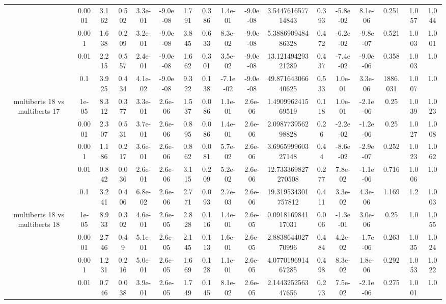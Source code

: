 \begin{tabular}{|c|c|c|c|c|c|c|c|c|c|c|c|c|c|c|c|c|}
 & 0.0001 & 3.162 & 0.502 & 3.3e-01 & -9.0e-08 & 1.791 & 0.386 & 1.4e-01 & -9.0e-08 & 3.544761657714843 & 0.393 & -5.8e-02 & 8.1e-06 & 0.251 & 1.057 & 1.044 \\
 & 0.001 & 1.638 & 0.209 & 3.2e-01 & -9.0e-08 & 3.845 & 0.633 & 8.3e-02 & -9.0e-08 & 5.388690948486328 & 0.472 & -6.2e-02 & -9.8e-07 & 0.521 & 1.003 & 1.001 \\
 & 0.01 & 2.215 & 0.557 & 2.4e-01 & -9.0e-08 & 1.662 & 0.301 & 3.5e-02 & -9.0e-08 & 13.12149429321289 & 0.437 & -7.4e-02 & -9.0e-06 & 0.358 & 1.003 & 1.0 \\
 & 0.1 & 3.925 & 0.434 & 4.1e-02 & -9.0e-08 & 9.322 & 0.138 & -7.1e-02 & -9.0e-08 & 49.87164306640625 & 0.533 & 1.0e-01 & 3.3e-06 & 1886.031 & 1.007 & 1.0 \\
\hline
\multirow{5}{*}{multiberts 18 vs multiberts 17} & 1e-05 & 8.312 & 0.377 & 3.3e-01 & 2.6e-06 & 1.537 & 0.086 & 1.1e-01 & 2.6e-06 & 1.490996241569519 & 0.118 & 1.0e-01 & -2.1e-06 & 0.25 & 1.039 & 1.023 \\
 & 0.0001 & 2.307 & 0.531 & 3.7e-01 & 2.6e-06 & 0.895 & 0.086 & 1.4e-01 & 2.6e-06 & 2.098773956298828 & 0.26 & -2.2e-02 & -1.2e-06 & 0.25 & 1.027 & 1.008 \\
 & 0.001 & 1.186 & 0.217 & 3.6e-01 & 2.6e-06 & 0.862 & 0.081 & 5.7e-02 & 2.6e-06 & 3.696599960327148 & 0.44 & -8.6e-02 & -2.9e-07 & 0.252 & 1.023 & 1.062 \\
 & 0.01 & 0.842 & 0.036 & 2.6e-01 & 2.6e-06 & 3.115 & 0.209 & 5.2e-02 & 2.6e-06 & 12.733369827270508 & 0.277 & 7.8e-02 & -1.1e-06 & 0.716 & 1.006 & 1.0 \\
 & 0.1 & 3.241 & 0.406 & 6.8e-02 & 2.6e-06 & 2.771 & 0.093 & 2.7e-03 & 2.6e-06 & 19.319534301757812 & 0.411 & 3.3e-02 & 4.3e-06 & 1.169 & 1.2 & 1.003 \\
\hline
\multirow{5}{*}{multiberts 18 vs multiberts 18} & 1e-05 & 8.933 & 0.302 & 4.6e-01 & 2.6e-05 & 2.828 & 0.116 & 1.4e-01 & 2.6e-05 & 0.091816984117031 & 0.006 & -1.3e-01 & 3.0e-06 & 0.25 & 1.0 & 1.055 \\
 & 0.0001 & 2.746 & 0.49 & 5.1e-01 & 2.6e-05 & 2.145 & 0.113 & 1.6e-01 & 2.6e-05 & 2.883864402770996 & 0.484 & 4.2e-02 & -1.7e-06 & 0.263 & 1.035 & 1.024 \\
 & 0.001 & 1.231 & 0.216 & 5.0e-01 & 2.6e-05 & 1.669 & 0.128 & 1.1e-01 & 2.6e-05 & 4.077019691467285 & 0.498 & 8.3e-02 & 1.8e-06 & 0.292 & 1.053 & 1.022 \\
 & 0.01 & 0.746 & 0.038 & 3.9e-01 & 2.6e-05 & 1.749 & 0.145 & 8.1e-02 & 2.6e-05 & 2.144325256347656 & 0.273 & 7.5e-02 & -2.1e-06 & 0.275 & 1.001 & 1.0 \\

\end{tabular}
